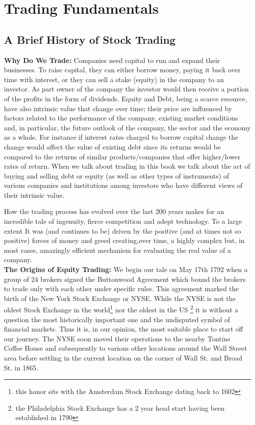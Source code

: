 \chapter{Trading Fundamentals}\label{chap:ch_trading_fund}
\section{A Brief History of Stock Trading}

\noindent\textbf{Why Do We Trade:} Companies need capital to run and expand their businesses. To raise capital, they can either borrow money, paying it back over time with interest, or they can sell a stake (equity) in the company to an investor. As part owner of the company the investor would then receive a portion of the profits in the form of dividends. Equity and Debt, being a scarce resource, have also intrinsic value that change over time; their price are influenced by factors related to the performance of the company, existing market conditions and, in particular, the future outlook of the company, the sector and the economy as a whole. For instance if interest rates charged to borrow capital change the change would affect the value of existing debt since its returns would be compared to the returns of similar products/companies that offer higher/lower rates of return. When we talk about trading in this book we talk about the act of buying and selling debt or equity (as well as other types of instruments) of various companies and institutions among investors who have different views of their intrinsic value.

How the trading process has evolved over the last 200 years makes for an incredible tale of ingenuity, fierce competition and adept technology. To a large extent It was (and continues to be) driven by the positive (and at times not so positive) forces of money and greed creating,over time, a highly complex but, in most cases, amazingly efficient mechanism for evaluating the real value of a company. \\


\noindent\textbf{The Origins of Equity Trading:} We begin our tale on May 17th 1792 when a group of 24 brokers signed the Buttonwood Agreement which bound the brokers to trade only with each other under specific rules. This agreement marked the birth of the New York Stock Exchange or NYSE. While the NYSE is not the oldest Stock Exchange in the world\footnote{this honor sits with the Amsterdam Stock Exchange dating back to 1602} nor the oldest in the US \footnote{the Philadelphia Stock Exchange has a 2 year head start having been established in 1790} it is without a question the most historically important one and the undisputed symbol of financial markets. Thus it is, in our opinion, the most suitable place to start off our journey.
The NYSE soon moved their operations to the nearby Tontine Coffee House and subsequently to various other locations around the Wall Street area before settling in the current location on the corner of Wall St. and Broad St. in 1865. \\

